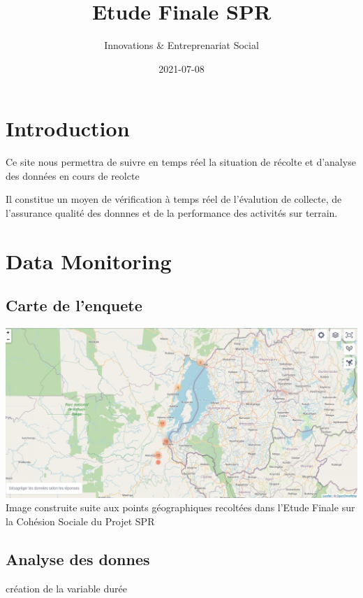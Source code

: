\documentclass[
]{book}
\title{Etude Finale SPR}
\author{Innovations \& Entreprenariat Social}
\date{2021-07-08}
\begin{document}
\maketitle

{
\setcounter{tocdepth}{1}
\tableofcontents
}
\hypertarget{introduction}{%
\chapter{Introduction}\label{introduction}}

Ce site nous permettra de suivre en temps réel la situation de récolte et d'analyse des données en cours de reolcte

Il constitue un moyen de vérification à temps réel de l'évalution de collecte, de l'assurance qualité des donnnes et de la performance des activités sur terrain.

\hypertarget{data-monitoring}{%
\chapter{Data Monitoring}\label{data-monitoring}}

\hypertarget{carte-de-lenquete}{%
\section{Carte de l'enquete}\label{carte-de-lenquete}}

\includegraphics{Carte_enquete.JPG}
Image construite suite aux points géographiques recoltées dans l'Etude Finale sur la Cohésion Sociale du Projet SPR

\hypertarget{analyse-des-donnes}{%
\section{Analyse des donnes}\label{analyse-des-donnes}}

création de la variable durée
\end{document}
